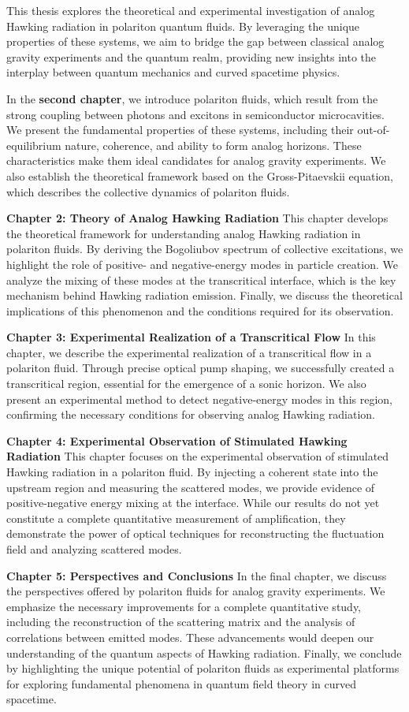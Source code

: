 This thesis explores the theoretical and experimental investigation of analog Hawking radiation in polariton quantum fluids. 
By leveraging the unique properties of these systems, we aim to bridge the gap between classical analog gravity experiments and the quantum realm, providing new insights into the interplay between quantum mechanics and curved spacetime physics.

  
In the \textbf{second chapter}, we introduce polariton fluids, which result from the strong coupling between photons and excitons in semiconductor microcavities. We present the fundamental properties of these systems, including their out-of-equilibrium nature, coherence, and ability to form analog horizons. These characteristics make them ideal candidates for analog gravity experiments. 
We also establish the theoretical framework based on the Gross-Pitaevskii equation, which describes the collective dynamics of polariton fluids.

\textbf{Chapter 2: Theory of Analog Hawking Radiation}  
This chapter develops the theoretical framework for understanding analog Hawking radiation in polariton fluids. By deriving the Bogoliubov spectrum of collective excitations, we highlight the role of positive- and negative-energy modes in particle creation. 
We analyze the mixing of these modes at the transcritical interface, which is the key mechanism behind Hawking radiation emission. Finally, we discuss the theoretical implications of this phenomenon and the conditions required for its observation.

\textbf{Chapter 3: Experimental Realization of a Transcritical Flow}  
In this chapter, we describe the experimental realization of a transcritical flow in a polariton fluid. Through precise optical pump shaping, we successfully created a transcritical region, essential for the emergence of a sonic horizon. We also present an experimental method to detect negative-energy modes in this region, confirming the necessary conditions for observing analog Hawking radiation.

\textbf{Chapter 4: Experimental Observation of Stimulated Hawking Radiation}  
This chapter focuses on the experimental observation of stimulated Hawking radiation in a polariton fluid. By injecting a coherent state into the upstream region and measuring the scattered modes, we provide evidence of positive-negative energy mixing at the interface. While our results do not yet constitute a complete quantitative measurement of amplification, they demonstrate the power of optical techniques for reconstructing the fluctuation field and analyzing scattered modes.

\textbf{Chapter 5: Perspectives and Conclusions}  
In the final chapter, we discuss the perspectives offered by polariton fluids for analog gravity experiments. We emphasize the necessary improvements for a complete quantitative study, including the reconstruction of the scattering matrix and the analysis of correlations between emitted modes. These advancements would deepen our understanding of the quantum aspects of Hawking radiation. Finally, we conclude by highlighting the unique potential of polariton fluids as experimental platforms for exploring fundamental phenomena in quantum field theory in curved spacetime.
